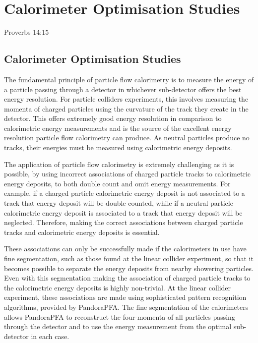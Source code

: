 \chapter{Calorimeter Optimisation Studies}
\label{chap:detopt}

{Proverbs 14:15}


\section{Calorimeter Optimisation Studies}
\label{sec:optimisationstudies}
The fundamental principle of particle flow calorimetry is to measure the energy of a particle passing through a detector in whichever sub-detector offers the best energy resolution.  For particle colliders experiments, this involves measuring the momenta of charged particles using the curvature of the track they create in the detector.  This offers extremely good energy resolution in comparison to calorimetric energy measurements and is the source of the excellent energy resolution particle flow calorimetry can produce.  As neutral particles produce no tracks, their energies must be measured using calorimetric energy deposits.  

The application of particle flow calorimetry is extremely challenging as it is possible, by using incorrect associations of charged particle tracks to calorimetric energy deposits, to both double count and omit energy measurements.  For example, if a charged particle calorimetric energy deposit is not associated to a track that energy deposit will be double counted, while if a neutral particle calorimetric energy deposit is associated to a track that energy deposit will be neglected.  Therefore, making the correct associations between charged particle tracks and calorimetric energy deposits is essential.  

These associations can only be successfully made if the calorimeters in use have fine segmentation, such as those found at the linear collider experiment, so that it becomes possible to separate the energy deposits from nearby showering particles.  Even with this segmentation making the association of charged particle tracks to the calorimetric energy deposits is highly non-trivial.  At the linear collider experiment, these associations are made using sophisticated pattern recognition algorithms, provided by PandoraPFA.  The fine segmentation of the calorimeters allows PandoraPFA to reconstruct the four-momenta of all particles passing through the detector and to use the energy measurement from the optimal sub-detector in each case. 

